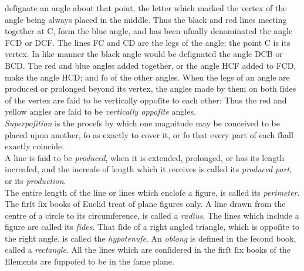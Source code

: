 \begin{minipage}{0.80\textwidth}
    deſignate an angle about that point, the letter which marked the vertex of the angle being always placed in the middle.  Thus the black and red lines meeting together at C, form the blue angle, and has been uſually denominated the angle FCD or DCF. The lines FC and CD are the legs of the angle; the point C is its vertex. In like manner the black angle would be deſignated the angle DCB or BCD. The red and blue angles added together, or the angle HCF added to FCD, make the angle HCD; and ſo of the other angles.  When the legs of an angle are produced or prolonged beyond its vertex, the angles made by them on both ſides of the vertex are ſaid to be vertically oppoſite to each other: Thus the red and yellow angles are ſaid to be \textit{vertically oppoſite} angles.\\

    \textit{Superpoſition} is the proceſs by which one magnitude may be conceived to be placed upon another, ſo as exactly to cover it, or ſo that every part of each ſhall exactly coincide.\\

    A line is ſaid to be \textit{produced}, when it is extended, prolonged, or has its length increaſed, and the increaſe of length which it receives is called its \textit{produced part}, or its \textit{production}.\\

    The entire length of the line or lines which encloſe a figure, is called its \textit{perimeter}. The firſt ſix books of Euclid treat of plane figures only. A line drawn from the centre of a circle to its circumference, is called a \textit{radius}. The lines which include a figure are called its \textit{ſides}. That ſide of a right angled triangle, which is oppoſite to the right angle, is called the \textit{hypotenuſe}. An \textit{oblong} is defined in the ſecond book, called a \textit{rectangle}. All the lines which are conſidered in the firſt ſix books of the Elements are ſuppoſed to be in the ſame plane.
\end{minipage}

\hfill


